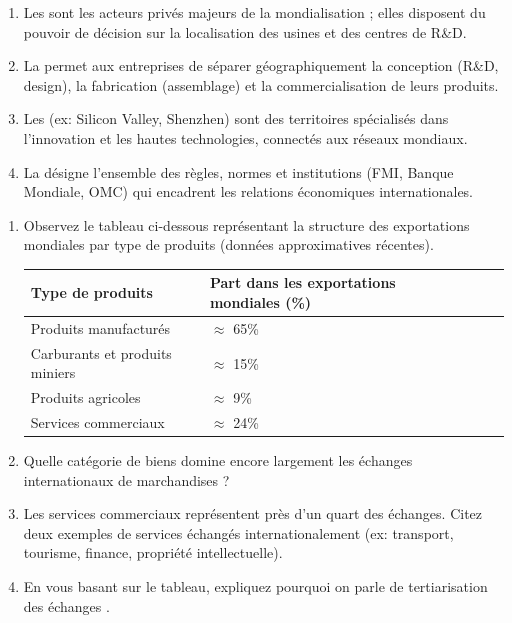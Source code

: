 \documentclass[11pt]{article}
\begin{document}
\begin{exercice}
\begin{enumerate}
    \item Les \underline{\hspace{5cm}} sont les acteurs privés majeurs de la mondialisation ; elles disposent du pouvoir de décision sur la localisation des usines et des centres de R\&D.
    \item La \underline{\hspace{5cm}} permet aux entreprises de séparer géographiquement la conception (R\&D, design), la fabrication (assemblage) et la commercialisation de leurs produits.
    \item Les \underline{\hspace{5cm}} (ex: Silicon Valley, Shenzhen) sont des territoires spécialisés dans l'innovation et les hautes technologies, connectés aux réseaux mondiaux.
    \item La \underline{\hspace{5cm}} désigne l'ensemble des règles, normes et institutions (FMI, Banque Mondiale, OMC) qui encadrent les relations économiques internationales.
\end{enumerate}
\end{exercice}

\begin{exercice}
\begin{enumerate}
    \item Observez le tableau ci-dessous représentant la structure des exportations mondiales par type de produits (données approximatives récentes).

    \begin{tabularx}{\linewidth}{lXXXX}
        \hline
        \textbf{Type de produits} & \textbf{Part dans les exportations mondiales (\%)} \\
        \hline
        Produits manufacturés & $\approx$ 65\% \\
        Carburants et produits miniers & $\approx$ 15\% \\
        Produits agricoles & $\approx$ 9\% \\
        Services commerciaux & $\approx$ 24\% \\
        \hline
    \end{tabularx}

    \item Quelle catégorie de biens domine encore largement les échanges internationaux de marchandises ?
    \item Les services commerciaux représentent près d'un quart des échanges. Citez deux exemples de services échangés internationalement (ex: transport, tourisme, finance, propriété intellectuelle).
    \item En vous basant sur le tableau, expliquez pourquoi on parle de \og tertiarisation des échanges \fg{}.
\end{enumerate}
\end{exercice}
\end{document}
